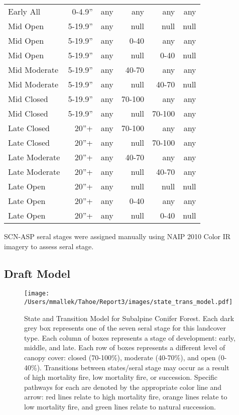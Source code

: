 \begin{table}[]
\begin{tabular}{@{}lrrrrr@{}}
Early All        & 0-4.9''         & any & any    & any    & any  \\
Mid Open         & 5-19.9''        & any & null   & null   & null \\
Mid Open         & 5-19.9''        & any & 0-40   & any    & any  \\
Mid Open         & 5-19.9''        & any & null   & 0-40   & null \\
Mid Moderate     & 5-19.9''        & any & 40-70  & any    & any  \\
Mid Moderate     & 5-19.9''        & any & null   & 40-70  & null \\
Mid Closed       & 5-19.9''        & any & 70-100 & any    & any  \\
Mid Closed       & 5-19.9''        & any & null   & 70-100 & any  \\
Late Closed      & 20''+           & any & 70-100 & any    & any  \\
Late Closed      & 20''+           & any & null   & 70-100 & any  \\
Late Moderate    & 20''+           & any & 40-70  & any    & any  \\
Late Moderate    & 20''+           & any & null   & 40-70  & any  \\
Late Open        & 20''+           & any & null   & null   & null \\
Late Open        & 20''+           & any & 0-40   & any    & any  \\
Late Open        & 20''+           & any & null   & 0-40   & null \\ \bottomrule
\end{tabular}
\end{table}

SCN-ASP seral stages were assigned manually using NAIP 2010 Color IR imagery to assess seral stage.

\subsection*{Draft Model}
\begin{figure}[htbp]
\centering
\texttt{[image: /Users/mmallek/Tahoe/Report3/images/state\_trans\_model.pdf]}
\caption{State and Transition Model for Subalpine Conifer Forest. Each dark grey box represents one of the seven seral stage for this landcover type. Each column of boxes represents a stage of development: early, middle, and late. Each row of boxes represents a different level of canopy cover: closed (70-100\%), moderate (40-70\%), and open (0-40\%). Transitions between states/seral stage may occur as a result of high mortality fire, low mortality fire, or succession. Specific pathways for each are denoted by the appropriate color line and arrow: red lines relate to high mortality fire, orange lines relate to low mortality fire, and green lines relate to natural succession.} 
\label{transmodel}
\end{figure}

